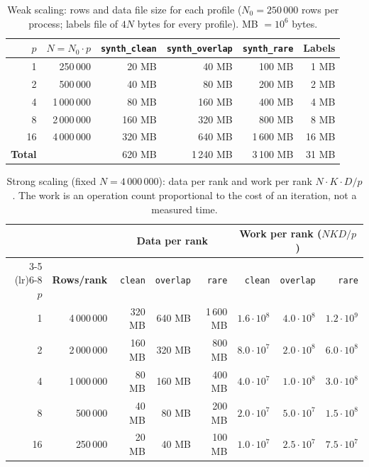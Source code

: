 \documentclass[conference]{IEEEtran}
\begin{document}
\begin{table}[p]
\centering
\caption{Weak scaling: rows and data file size for each profile ($N_0 = 250\,000$ rows per process; labels file of $4N$ bytes for every profile). MB $= 10^6$ bytes.}
\label{tab:weak}
\footnotesize
\setlength{\tabcolsep}{3pt}
\begin{tabular}{rrrrrr}
\toprule
\textbf{$p$} & \textbf{$N = N_0 \cdot p$} & \texttt{synth\_clean} & \texttt{synth\_overlap} & \texttt{synth\_rare} & \textbf{Labels} \\
\midrule
1  & 250\,000   & 20 MB  & 40 MB  & 100 MB   & 1 MB \\
2  & 500\,000   & 40 MB  & 80 MB  & 200 MB   & 2 MB \\
4  & 1\,000\,000 & 80 MB  & 160 MB & 400 MB   & 4 MB \\
8  & 2\,000\,000 & 160 MB & 320 MB & 800 MB   & 8 MB \\
16 & 4\,000\,000 & 320 MB & 640 MB & 1\,600 MB & 16 MB \\
\midrule
\textbf{Total} & & 620 MB & 1\,240 MB & 3\,100 MB & 31 MB \\
\bottomrule
\end{tabular}
\end{table}
\clearpage

\begin{table}[p]
\centering
\caption{Strong scaling (fixed $N = 4\,000\,000$): data per rank and work per rank $N \cdot K \cdot D / p$. The work is an operation count proportional to the cost of an iteration, not a measured time.}
\label{tab:strong}
\footnotesize
\setlength{\tabcolsep}{3pt}
\begin{tabular}{rrrrrrrr}
\toprule
 & & \multicolumn{3}{c}{\textbf{Data per rank}} & \multicolumn{3}{c}{\textbf{Work per rank ($N K D / p$)}} \\
\cmidrule(lr){3-5} \cmidrule(lr){6-8}
\textbf{$p$} & \textbf{Rows/rank} & \texttt{clean} & \texttt{overlap} & \texttt{rare} & \texttt{clean} & \texttt{overlap} & \texttt{rare} \\
\midrule
1  & 4\,000\,000 & 320 MB & 640 MB & 1\,600 MB & $1.6 \cdot 10^8$ & $4.0 \cdot 10^8$ & $1.2 \cdot 10^9$ \\
2  & 2\,000\,000 & 160 MB & 320 MB & 800 MB    & $8.0 \cdot 10^7$ & $2.0 \cdot 10^8$ & $6.0 \cdot 10^8$ \\
4  & 1\,000\,000 & 80 MB  & 160 MB & 400 MB    & $4.0 \cdot 10^7$ & $1.0 \cdot 10^8$ & $3.0 \cdot 10^8$ \\
8  & 500\,000    & 40 MB  & 80 MB  & 200 MB    & $2.0 \cdot 10^7$ & $5.0 \cdot 10^7$ & $1.5 \cdot 10^8$ \\
16 & 250\,000    & 20 MB  & 40 MB  & 100 MB    & $1.0 \cdot 10^7$ & $2.5 \cdot 10^7$ & $7.5 \cdot 10^7$ \\
\bottomrule
\end{tabular}
\end{table}
\clearpage
\end{document}
